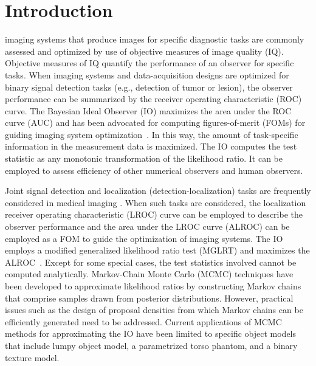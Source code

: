 \documentclass[journal]{IEEEtran}
\begin{document}
\section{Introduction}
\label{sec:introduction}
 imaging systems that produce images for specific diagnostic tasks 
are commonly assessed and optimized by use of objective measures of image quality (IQ).
Objective measures of IQ
quantify the performance of an observer for specific tasks\cite{barrett2013foundations, kupinski2003ideal, park2007channelized, park2009efficient, shen2006using, zhou2019approximating,zhou2018learning,zhou2019learningHO,zhou2020markov}. 
When imaging systems and data-acquisition designs are optimized for binary signal detection tasks (e.g., detection of tumor or lesion), 
the observer performance can be summarized by the receiver operating characteristic (ROC) curve.
The Bayesian Ideal Observer (IO) maximizes the area under the ROC curve (AUC) 
and has been advocated for computing figures-of-merit (FOMs) for guiding imaging system optimization~\cite{barrett2013foundations,kupinski2003ideal,zhou2019approximating}.
In this way, the amount of task-specific information in the measurement data is maximized.
The IO computes the test statistic as any monotonic transformation of the likelihood ratio\cite{barrett2013foundations}. 
It can be employed to assess efficiency of other numerical observers and human observers{\cite{burgess1981efficiency, liu1995object}}.

Joint signal detection and localization (detection-localization) tasks are frequently considered in medical
 imaging \cite{starr1975visual, gifford1999comparison, gifford2005comparison, zhou2009collimator, wunderlich2016optimal}.
When such tasks are considered,
the localization receiver operating characteristic (LROC) curve can be employed
 to describe the observer performance
and the area under the LROC curve (ALROC) can be employed
 as a FOM to guide the optimization of imaging systems. 
The IO employs a modified generalized likelihood ratio test (MGLRT) and maximizes the ALROC~\cite{khurd2005decision}.
Except for some special cases, the test statistics involved cannot be computed analytically.
Markov-Chain Monte Carlo (MCMC) techniques\cite{kupinski2003ideal} have been developed to approximate likelihood ratios by constructing Markov chains 
that comprise samples drawn from posterior distributions.
However, practical issues such as the design of proposal densities from which Markov chains can be efficiently generated need to be addressed. 
Current applications of MCMC methods for approximating the IO have been limited to specific object models 
that include lumpy object model\cite{kupinski2003ideal}, a parametrized torso phantom\cite{he2008toward}, and a binary texture model\cite{abbey2008ideal}.
\end{document}
